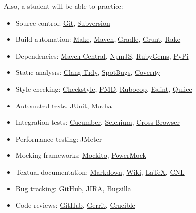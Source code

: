 \documentclass[nobrand,anonymous,nodate,nosecurity]{huawei}
\begin{document}
{Also, a student will be able to practice:

\begin{itemize}
\item Source control:
	\href{https://git-scm.com}{Git},
	\href{https://subversion.apache.org}{Subversion}
\item Build automation:
	\href{https://en.wikipedia.org/wiki/Make_(software)}{Make},
	\href{https://maven.apache.org}{Maven},
	\href{https://gradle.org}{Gradle},
	\href{https://gruntjs.com}{Grunt},
	\href{https://github.com/ruby/rake}{Rake}
\item Dependencies:
	\href{https://maven.apache.org}{Maven Central},
	\href{https://www.npmjs.com}{NpmJS},
	\href{https://rubygems.org}{RubyGems},
	\href{https://pypi.org/project/pip/}{PyPi}
\item Static analysis:
	\href{https://clang.llvm.org/extra/clang-tidy/}{Clang-Tidy},
	\href{https://spotbugs.github.io}{SpotBugs},
	\href{https://scan.coverity.com}{Coverity}
\item Style checking:
  \href{https://checkstyle.sourceforge.io}{Checkstyle},
  \href{https://pmd.github.io}{PMD},
  \href{https://rubocop.org}{Rubocop},
  \href{https://eslint.org}{Eslint},
  \href{https://www.qulice.com}{Qulice}
\item Automated tests:
	\href{https://junit.org/}{JUnit},
	\href{https://mochajs.org}{Mocha}
\item Integration tests:
  \href{https://cucumber.io}{Cucumber},
  \href{https://www.selenium.dev}{Selenium},
  \href{https://en.wikipedia.org/wiki/Cross-browser_testing}{Cross-Browser}
\item Performance testing:
  \href{https://jmeter.apache.org}{JMeter}
\item Mocking frameworks:
	\href{https://site.mockito.org}{Mockito},
	\href{https://github.com/powermock/powermock}{PowerMock}
\item Textual documentation:
	\href{https://en.wikipedia.org/wiki/Markdown}{Markdown},
	\href{https://en.wikipedia.org/wiki/Wiki}{Wiki},
	\href{https://en.wikipedia.org/wiki/LaTeX}{LaTeX},
  \href{https://en.wikipedia.org/wiki/Controlled_natural_language}{CNL}
\item Bug tracking:
	\href{github.com/}{GitHub},
	\href{https://www.atlassian.com/software/jira}{JIRA},
	\href{https://www.bugzilla.org}{Bugzilla}
\item Code reviews:
	\href{github.com/}{GitHub},
	\href{https://www.gerritcodereview.com}{Gerrit},
	\href{https://www.atlassian.com/software/crucible}{Crucible}

\end{itemize}}
\end{document}
